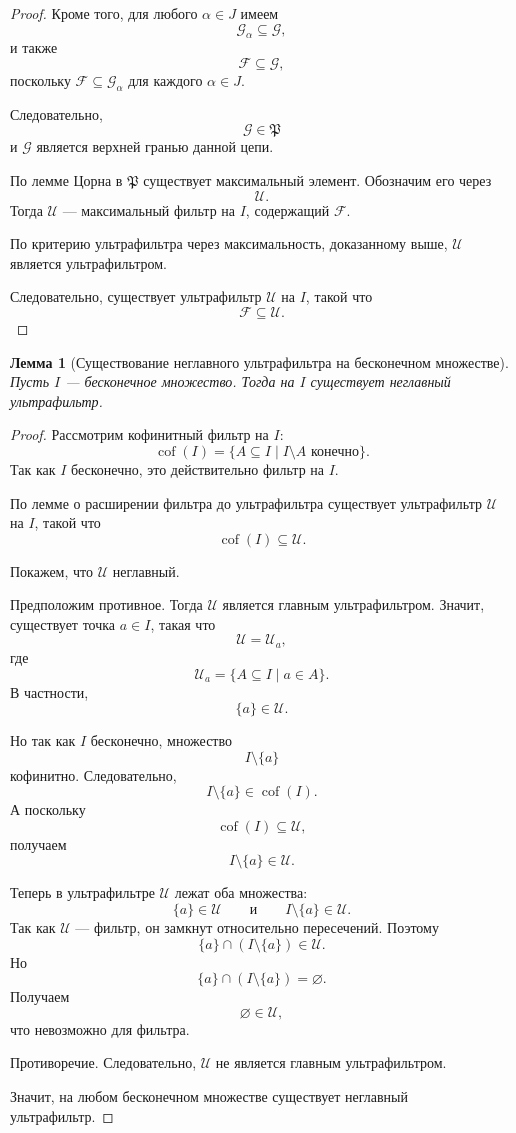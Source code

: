 \documentclass[12pt,a4paper,oneside,openany]{book}
\theoremstyle{definition}
\theoremstyle{plain}
\newtheorem{lemma}{Лемма}[chapter]
\theoremstyle{remark}
\begin{document}
\begin{proof}
Кроме того, для любого $\alpha\in J$ имеем
\[
\mathcal G_\alpha\subseteq\mathcal G,
\]
и также
\[
\mathcal F\subseteq\mathcal G,
\]
поскольку $\mathcal F\subseteq\mathcal G_\alpha$ для каждого $\alpha\in J$.

Следовательно,
\[
\mathcal G\in\mathfrak P
\]
и $\mathcal G$ является верхней гранью данной цепи.

По лемме Цорна в $\mathfrak P$ существует максимальный элемент. Обозначим его через
\[
\mathcal U.
\]
Тогда $\mathcal U$ — максимальный фильтр на $I$, содержащий $\mathcal F$.

По критерию ультрафильтра через максимальность, доказанному выше, $\mathcal U$ является ультрафильтром.

Следовательно, существует ультрафильтр $\mathcal U$ на $I$, такой что
\[
\mathcal F\subseteq\mathcal U.
\]
\end{proof}

\begin{lemma}[Существование неглавного ультрафильтра на бесконечном множестве]
Пусть $I$ — бесконечное множество. Тогда на $I$ существует неглавный ультрафильтр.
\end{lemma}

\begin{proof}
Рассмотрим кофинитный фильтр на $I$:
\[
\operatorname{cof}(I)
=
\{A\subseteq I\mid I\setminus A\text{ конечно}\}.
\]
Так как $I$ бесконечно, это действительно фильтр на $I$.

По лемме о расширении фильтра до ультрафильтра существует ультрафильтр $\mathcal U$ на $I$, такой что
\[
\operatorname{cof}(I)\subseteq\mathcal U.
\]

Покажем, что $\mathcal U$ неглавный.

Предположим противное. Тогда $\mathcal U$ является главным ультрафильтром. Значит, существует точка $a\in I$, такая что
\[
\mathcal U=\mathcal U_a,
\]
где
\[
\mathcal U_a=\{A\subseteq I\mid a\in A\}.
\]
В частности,
\[
\{a\}\in\mathcal U.
\]

Но так как $I$ бесконечно, множество
\[
I\setminus\{a\}
\]
кофинитно. Следовательно,
\[
I\setminus\{a\}\in\operatorname{cof}(I).
\]
А поскольку
\[
\operatorname{cof}(I)\subseteq\mathcal U,
\]
получаем
\[
I\setminus\{a\}\in\mathcal U.
\]

Теперь в ультрафильтре $\mathcal U$ лежат оба множества:
\[
\{a\}\in\mathcal U
\qquad
\text{и}
\qquad
I\setminus\{a\}\in\mathcal U.
\]
Так как $\mathcal U$ — фильтр, он замкнут относительно пересечений. Поэтому
\[
\{a\}\cap(I\setminus\{a\})\in\mathcal U.
\]
Но
\[
\{a\}\cap(I\setminus\{a\})=\varnothing.
\]
Получаем
\[
\varnothing\in\mathcal U,
\]
что невозможно для фильтра.

Противоречие. Следовательно, $\mathcal U$ не является главным ультрафильтром.

Значит, на любом бесконечном множестве существует неглавный ультрафильтр.
\end{proof}
\end{document}

